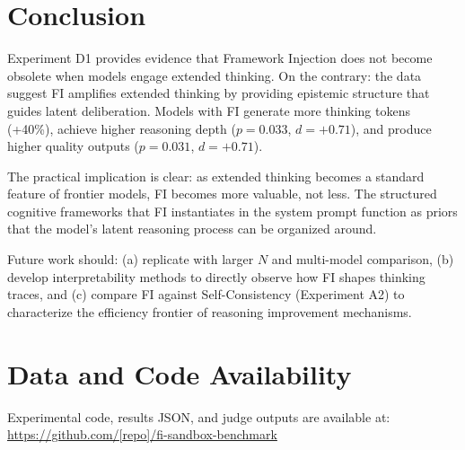 \documentclass[11pt,a4paper]{article}
\begin{document}
\section{Conclusion}

Experiment D1 provides evidence that Framework Injection does not become obsolete
when models engage extended thinking. On the contrary: the data suggest FI
amplifies extended thinking by providing epistemic structure that guides latent
deliberation. Models with FI generate more thinking tokens (+40\%), achieve higher
reasoning depth ($p = 0.033$, $d = +0.71$), and produce higher quality outputs
($p = 0.031$, $d = +0.71$).

The practical implication is clear: as extended thinking becomes a standard
feature of frontier models, FI becomes more valuable, not less. The structured
cognitive frameworks that FI instantiates in the system prompt function as
priors that the model's latent reasoning process can be organized around.

Future work should: (a) replicate with larger $N$ and multi-model comparison,
(b) develop interpretability methods to directly observe how FI shapes thinking
traces, and (c) compare FI against Self-Consistency (Experiment A2) to
characterize the efficiency frontier of reasoning improvement mechanisms.

\section*{Data and Code Availability}

Experimental code, results JSON, and judge outputs are available at:\\
\url{https://github.com/[repo]/fi-sandbox-benchmark}
\end{document}
